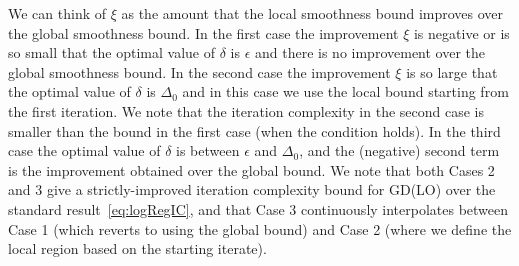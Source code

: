 \documentclass[10pt]{article} %
\newif\ifshowcolours
\def\red{red}
\def\blue{blue}
\def\green{green}
\renewcommand{\textcolor}[2]{%
  \ifshowcolours
    {\color{#1}#2}%
  \else
    \def\temp{#1}%
    \ifx\temp\red     #2\else
    \ifx\temp\blue    #2\else
    \ifx\temp\green   #2\else
        {\color{#1}#2}%
    \fi\fi\fi
  \fi
}
\begin{document}
We can think of $\xi$ as the amount that the local smoothness bound improves over the global smoothness bound.
In the first case the improvement $\xi$ is negative or is so small that the optimal value of $\delta$ is $\epsilon$ and there is no improvement over the global smoothness bound. In the second case the improvement $\xi$ is so large that the optimal value of $\delta$ is $\Delta_0$ and in this case we use the local bound starting from the first iteration. We note that the iteration complexity in the second case is smaller than the bound in the first case (when the condition holds).
In the third case the optimal value of $\delta$ is between $\epsilon$ and $\Delta_0$, and the (negative) second term is the improvement obtained over the global bound. 
We note that both Cases 2 and 3 give a strictly-improved iteration complexity bound for GD(LO) over the standard result~\eqref{eq:logRegIC}, and that Case 3 continuously interpolates between Case 1 (which reverts to using the global bound) and Case 2 (where we define the local region based on the starting iterate).

\end{document}
